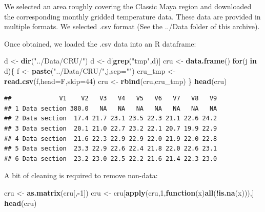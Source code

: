 \documentclass[]{article}
\newenvironment{Shaded}{\begin{snugshade}}{\end{snugshade}}
\newcommand{\KeywordTok}[1]{\textcolor[rgb]{0.13,0.29,0.53}{\textbf{#1}}}
\newcommand{\DataTypeTok}[1]{\textcolor[rgb]{0.13,0.29,0.53}{#1}}
\newcommand{\DecValTok}[1]{\textcolor[rgb]{0.00,0.00,0.81}{#1}}
\newcommand{\StringTok}[1]{\textcolor[rgb]{0.31,0.60,0.02}{#1}}
\newcommand{\ControlFlowTok}[1]{\textcolor[rgb]{0.13,0.29,0.53}{\textbf{#1}}}
\newcommand{\OperatorTok}[1]{\textcolor[rgb]{0.81,0.36,0.00}{\textbf{#1}}}
\newcommand{\NormalTok}[1]{#1}
\begin{document}
We selected an area roughly covering the Classic Maya region and
downloaded the corresponding monthly gridded temperature data. These
data are provided in multiple formats. We selected .csv format (See the
../Data folder of this archive).

Once obtained, we loaded the .csv data into an R dataframe:

\begin{Shaded}
\begin{Highlighting}[]
\NormalTok{d <-}\StringTok{ }\KeywordTok{dir}\NormalTok{(}\StringTok{"../Data/CRU/"}\NormalTok{)}
\NormalTok{d <-}\StringTok{ }\NormalTok{d[}\KeywordTok{grep}\NormalTok{(}\StringTok{"tmp"}\NormalTok{,d)]}
\NormalTok{cru <-}\StringTok{ }\KeywordTok{data.frame}\NormalTok{()}
\ControlFlowTok{for}\NormalTok{(j }\ControlFlowTok{in}\NormalTok{ d)\{}
\NormalTok{    f <-}\StringTok{ }\KeywordTok{paste}\NormalTok{(}\StringTok{"../Data/CRU/"}\NormalTok{,j,}\DataTypeTok{sep=}\StringTok{""}\NormalTok{)}
\NormalTok{    cru_tmp <-}\StringTok{ }\KeywordTok{read.csv}\NormalTok{(f,}\DataTypeTok{head=}\NormalTok{F,}\DataTypeTok{skip=}\DecValTok{44}\NormalTok{)}
\NormalTok{    cru <-}\StringTok{ }\KeywordTok{rbind}\NormalTok{(cru,cru_tmp)}
\NormalTok{\}}
\KeywordTok{head}\NormalTok{(cru)}
\end{Highlighting}
\end{Shaded}

\begin{verbatim}
##             V1    V2   V3   V4   V5   V6   V7   V8   V9
## 1 Data section 380.0   NA   NA   NA   NA   NA   NA   NA
## 2 Data section  17.4 21.7 23.1 23.5 22.3 21.1 22.6 24.2
## 3 Data section  20.1 21.0 22.7 23.2 22.1 20.7 19.9 22.9
## 4 Data section  21.6 22.3 22.9 22.9 22.0 21.9 22.0 22.8
## 5 Data section  23.3 22.9 22.6 22.4 21.8 22.0 22.6 23.1
## 6 Data section  23.2 23.0 22.5 22.2 21.6 21.4 22.3 23.0
\end{verbatim}

A bit of cleaning is required to remove non-data:

\begin{Shaded}
\begin{Highlighting}[]
\NormalTok{cru <-}\StringTok{ }\KeywordTok{as.matrix}\NormalTok{(cru[,}\OperatorTok{-}\DecValTok{1}\NormalTok{])}
\NormalTok{cru <-}\StringTok{ }\NormalTok{cru[}\KeywordTok{apply}\NormalTok{(cru,}\DecValTok{1}\NormalTok{,}\ControlFlowTok{function}\NormalTok{(x)}\KeywordTok{all}\NormalTok{(}\OperatorTok{!}\KeywordTok{is.na}\NormalTok{(x))),]}
\KeywordTok{head}\NormalTok{(cru)}
\end{Highlighting}
\end{Shaded}
\end{document}
